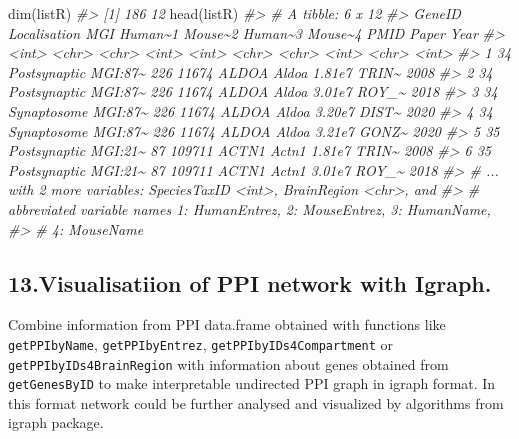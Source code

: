 \documentclass[
]{article}
\newenvironment{Shaded}{\begin{snugshade}}{\end{snugshade}}
\newcommand{\CommentTok}[1]{\textcolor[rgb]{0.56,0.35,0.01}{\textit{#1}}}
\newcommand{\FunctionTok}[1]{\textcolor[rgb]{0.00,0.00,0.00}{#1}}
\newcommand{\NormalTok}[1]{#1}
\begin{document}
\begin{Shaded}
\begin{Highlighting}[]
\FunctionTok{dim}\NormalTok{(listR)}
\CommentTok{\#\textgreater{} [1] 186  12}
\FunctionTok{head}\NormalTok{(listR)}
\CommentTok{\#\textgreater{} \# A tibble: 6 x 12}
\CommentTok{\#\textgreater{}   GeneID Localisation MGI     Human\textasciitilde{}1 Mouse\textasciitilde{}2 Human\textasciitilde{}3 Mouse\textasciitilde{}4   PMID Paper  Year}
\CommentTok{\#\textgreater{}    \textless{}int\textgreater{} \textless{}chr\textgreater{}        \textless{}chr\textgreater{}     \textless{}int\textgreater{}   \textless{}int\textgreater{} \textless{}chr\textgreater{}   \textless{}chr\textgreater{}    \textless{}int\textgreater{} \textless{}chr\textgreater{} \textless{}int\textgreater{}}
\CommentTok{\#\textgreater{} 1     34 Postsynaptic MGI:87\textasciitilde{}     226   11674 ALDOA   Aldoa   1.81e7 TRIN\textasciitilde{}  2008}
\CommentTok{\#\textgreater{} 2     34 Postsynaptic MGI:87\textasciitilde{}     226   11674 ALDOA   Aldoa   3.01e7 ROY\_\textasciitilde{}  2018}
\CommentTok{\#\textgreater{} 3     34 Synaptosome  MGI:87\textasciitilde{}     226   11674 ALDOA   Aldoa   3.20e7 DIST\textasciitilde{}  2020}
\CommentTok{\#\textgreater{} 4     34 Synaptosome  MGI:87\textasciitilde{}     226   11674 ALDOA   Aldoa   3.21e7 GONZ\textasciitilde{}  2020}
\CommentTok{\#\textgreater{} 5     35 Postsynaptic MGI:21\textasciitilde{}      87  109711 ACTN1   Actn1   1.81e7 TRIN\textasciitilde{}  2008}
\CommentTok{\#\textgreater{} 6     35 Postsynaptic MGI:21\textasciitilde{}      87  109711 ACTN1   Actn1   3.01e7 ROY\_\textasciitilde{}  2018}
\CommentTok{\#\textgreater{} \# ... with 2 more variables: SpeciesTaxID \textless{}int\textgreater{}, BrainRegion \textless{}chr\textgreater{}, and}
\CommentTok{\#\textgreater{} \#   abbreviated variable names 1: HumanEntrez, 2: MouseEntrez, 3: HumanName,}
\CommentTok{\#\textgreater{} \#   4: MouseName}
\end{Highlighting}
\end{Shaded}

\hypertarget{visualisatiion-of-ppi-network-with-igraph.}{%
\subsection{13.Visualisatiion of PPI network with
Igraph.}\label{visualisatiion-of-ppi-network-with-igraph.}}

Combine information from PPI data.frame obtained with functions like
\texttt{getPPIbyName}, \texttt{getPPIbyEntrez},
\texttt{getPPIbyIDs4Compartment} or \texttt{getPPIbyIDs4BrainRegion}
with information about genes obtained from \texttt{getGenesByID} to make
interpretable undirected PPI graph in igraph format. In this format
network could be further analysed and visualized by algorithms from
igraph package.
\end{document}
